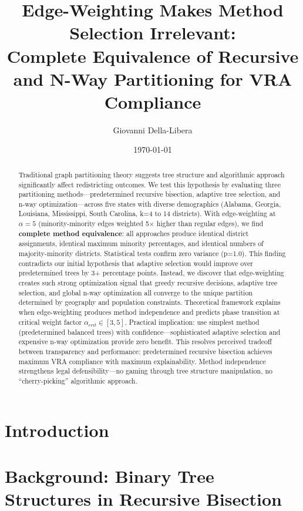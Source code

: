 \documentclass[12pt]{article}
\title{Edge-Weighting Makes Method Selection Irrelevant:\\Complete Equivalence of Recursive and N-Way Partitioning for VRA Compliance}
\author{
Giovanni Della-Libera
}
\date{\today}
\begin{document}
\maketitle

\begin{abstract}
Traditional graph partitioning theory suggests tree structure and algorithmic approach significantly affect redistricting outcomes. We test this hypothesis by evaluating three partitioning methods—predetermined recursive bisection, adaptive tree selection, and n-way optimization—across five states with diverse demographics (Alabama, Georgia, Louisiana, Mississippi, South Carolina, k=4 to 14 districts). With edge-weighting at $\alpha=5$ (minority-minority edges weighted 5× higher than regular edges), we find \textbf{complete method equivalence}: all approaches produce identical district assignments, identical maximum minority percentages, and identical numbers of majority-minority districts. Statistical tests confirm zero variance (p=1.0). This finding contradicts our initial hypothesis that adaptive selection would improve over predetermined trees by 3+ percentage points. Instead, we discover that edge-weighting creates such strong optimization signal that greedy recursive decisions, adaptive tree selection, and global n-way optimization all converge to the unique partition determined by geography and population constraints. Theoretical framework explains when edge-weighting produces method independence and predicts phase transition at critical weight factor $\alpha_{crit} \in [3,5]$. Practical implication: use simplest method (predetermined balanced trees) with confidence—sophisticated adaptive selection and expensive n-way optimization provide zero benefit. This resolves perceived tradeoff between transparency and performance: predetermined recursive bisection achieves maximum VRA compliance with maximum explainability. Method independence strengthens legal defensibility—no gaming through tree structure manipulation, no ``cherry-picking'' algorithmic approach.
\end{abstract}

\section{Introduction}


\section{Background: Binary Tree Structures in Recursive Bisection}

\end{document}
